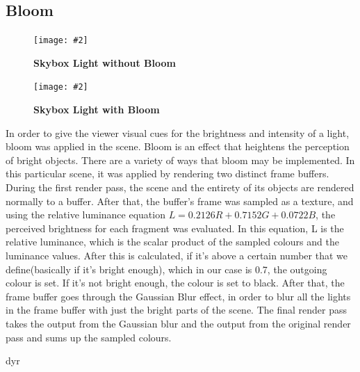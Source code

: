 \documentclass[10pt, a4paper]{article}
\newcommand{\figuremacro}[5]{
    \begin{figure}[#1]
        \centering
        \texttt{[image: \#2]}
        \caption[#3]{\textbf{#3}#4}
        \label{fig:#2}
    \end{figure}
}
\begin{document}
\subsection{Bloom}

	\figuremacro{H}{withoutBloom}{Skybox Light without Bloom}{ }{1.0}
	\figuremacro{H}{withBloom}{Skybox Light with Bloom}{ }{1.0}
	
	In order to give the viewer visual cues for the brightness and intensity of a light, bloom was applied in the scene. Bloom is an effect that heightens the perception of bright objects. There are a variety of ways that bloom may be implemented. In this particular scene, it was applied by rendering two distinct frame buffers. During the first render pass, the scene and the entirety of its objects are rendered normally to a buffer. After that, the buffer's frame was sampled as a texture, and using the relative luminance equation \(L = 0.2126R + 0.7152G+0.0722B\), the perceived brightness for each fragment was evaluated. In this equation, L is the relative luminance, which is the scalar product of the sampled colours and the luminance values. After this is calculated, if it's above a certain number that we define(basically if it's bright enough), which in our case is 0.7, the outgoing colour is set. If it's not bright enough, the colour is set to black. After that, the frame buffer goes through the Gaussian Blur effect, in order to blur all the lights in the frame buffer with just the bright parts of the scene. The final render pass takes the output from the Gaussian blur and the output from the original render pass and sums up the sampled colours.
	
	
	

\iffalse
dyr
\end{document}
